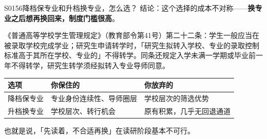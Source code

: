 \begin{qa}{S0156}{降档保专业和升档换专业，怎么选？}
结论：这个选择的成本不对称——\textbf{换专业之后想再换回来，制度门槛很高}。

《普通高等学校学生管理规定》（教育部令第41号）第二十二条：学生一般应当在被录取学校完成学业；研究生申请转学时，「研究生拟转入学校、专业的录取控制标准高于其所在学校、专业的」不得转学。同条还规定入学未满一学期或毕业前一年不得转学，研究生转学须经拟转入专业导师同意。

\par\vspace{2pt}\nobreak\begin{center}\footnotesize
\begin{tabularx}{\textwidth}{>{\raggedright\arraybackslash}X>{\raggedright\arraybackslash}X>{\raggedright\arraybackslash}X}
\toprule
\textbf{选项} & \textbf{你保住的} & \textbf{你放弃的} \\ \midrule
降档保专业 & 专业身份连续性、导师圈层 & 学校层次的筛选优势 \\
升档换专业 & 学校层次、转行机会 & 原有积累，几乎无回退通道 \\
\bottomrule
\end{tabularx}
\end{center}\vspace{2pt}\par

也就是说，「先读着，不合适再换」在读研阶段基本不可行。
\end{qa}

